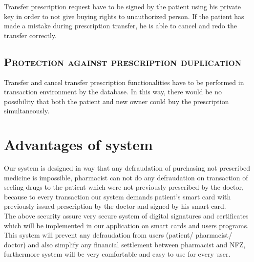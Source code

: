 Transfer prescription request have to be signed by the patient using his private key in order to not give buying rights to unauthorized person. If the patient has made a mistake during prescription transfer, he is able to cancel and redo the transfer correctly.

\subsection{\textsc{Protection against prescription duplication}}

Transfer and cancel transfer prescription functionalities have to be performed in transaction environment by the database. In this way, there would be no possibility that both the patient and new owner could buy the prescription simultaneously.


\section{Advantages of system}

Our system is designed in way that any defraudation of purchasing not prescribed medicine is impossible, pharmacist can not do any defraudation on transaction of seeling drugs to the patient which were not previously prescribed by the doctor, because to every transaction our system demands patient's smart card with previously issued prescription by the doctor and signed by his smart card.
\\

The above security assure very secure system of digital signatures and certificates which will be implemented in our application on smart cards and users programs. This system will prevent any defraudation from users (patient/ pharmacist/ doctor) and also simplify any financial settlement between pharmacist and NFZ, furthermore system will be very comfortable and easy to use for every user.

